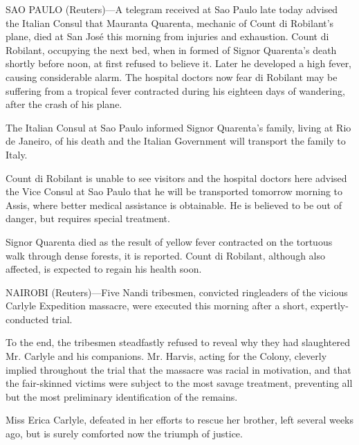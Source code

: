 \documentclass{newspaper1920}
\begin{document}
\vspace{-\baselineskip}\fullrule
\vspace{-\baselineskip}

\begin{multicols}{3}


SAO PAULO (Reuters)---A telegram received at Sao Paulo late today
advised the Italian Consul that Mauranta Quarenta, mechanic of Count
di Robilant's plane, died at San José this morning from injuries and
exhaustion.  Count di Robilant, occupying the next bed, when in formed
of Signor Quarenta's death shortly before noon, at first refused to
believe it.  Later he developed a high fever, causing considerable
alarm.  The hospital doctors now fear di Robilant may be suffering
from a tropical fever contracted during his eighteen days of
wandering, after the crash of his plane.

The Italian Consul at Sao Paulo informed Signor Quarenta's family,
living at Rio de Janeiro, of his death and the Italian Government will
transport the family to Italy.

Count di Robilant is unable to see visitors and the hospital doctors
here advised the Vice Consul at Sao Paulo that he will be transported
tomorrow morning to Assis, where better medical assistance is
obtainable.  He is believed to be out of danger, but requires special
treatment.

Signor Quarenta died as the result of yellow fever contracted on the
tortuous walk through dense forests, it is reported.  Count di
Robilant, although also affected, is expected to regain his health
soon.

\fullrule


NAIROBI (Reuters)---Five Nandi tribesmen, convicted ringleaders of
the vicious Carlyle Expedition massacre, were executed this morning
after a short, expertly-conducted trial.

To the end, the tribesmen steadfastly refused to reveal why they had
slaughtered Mr. Carlyle and his companions.  Mr. Harvis, acting for
the Colony, cleverly implied throughout the trial that the massacre
was racial in motivation, and that the fair-skinned victims were
subject to the most savage treatment, preventing all but the most
preliminary identification of the remains.

Miss Erica Carlyle, defeated in her efforts to rescue her brother,
left several weeks ago, but is surely comforted now the triumph of
justice.


\end{multicols}
\end{document}
